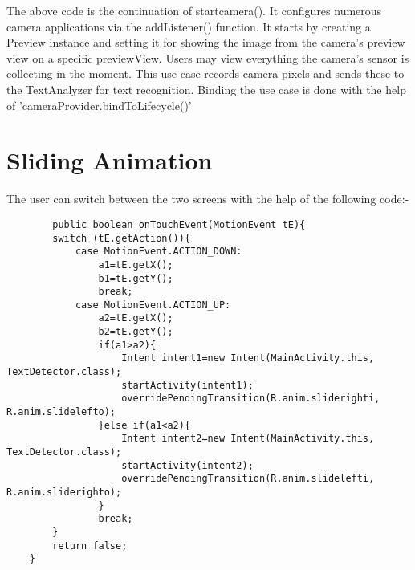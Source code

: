 \documentclass[MScCS]{uccthesis}
\begin{document}
The above code is the continuation of startcamera(). It configures numerous camera applications via the addListener() function. It starts by creating a Preview instance and setting it for showing the image from the camera's preview view on a specific previewView. Users may view everything the camera's sensor is collecting in the moment.  This use case records camera pixels and sends these to the TextAnalyzer for text recognition. Binding the use case is done with the help of 'cameraProvider.bindToLifecycle()'


\section{Sliding Animation}
The user can switch between the two screens with the help of the following code:-
\begin{scriptsize}
    \begin{verbatim}
        public boolean onTouchEvent(MotionEvent tE){
        switch (tE.getAction()){
            case MotionEvent.ACTION_DOWN:
                a1=tE.getX();
                b1=tE.getY();
                break;
            case MotionEvent.ACTION_UP:
                a2=tE.getX();
                b2=tE.getY();
                if(a1>a2){
                    Intent intent1=new Intent(MainActivity.this, TextDetector.class);
                    startActivity(intent1);
                    overridePendingTransition(R.anim.sliderighti, R.anim.slidelefto);
                }else if(a1<a2){
                    Intent intent2=new Intent(MainActivity.this, TextDetector.class);
                    startActivity(intent2);
                    overridePendingTransition(R.anim.slidelefti, R.anim.sliderighto);
                }
                break;
        }
        return false;
    }
    \end{verbatim}
\end{scriptsize}
 The 'onTouchEvent' method is generally used to manage all the touch events on the android device. The Switch method is used to handle the motion events such as ACTION-UP and ACTION-DOWN. ACTION-DOWN event is when the user touches the screen and both the coordinates are obtained by touchEvent.getX() and touchEvent.getY() and for the ACTION-UP is when the user user removes the hand from the screen. The conditions are checked to determine whether the user slide the screen from right to left or left to right. In this case the the code is written in such a way that it does not matter if the user slides to the left or to the right, the screen will definitely go to the other activity as there are only two screens. The method overridePendingTransition() is a in-build method to perform the animation on the given screens.
\end{document}
